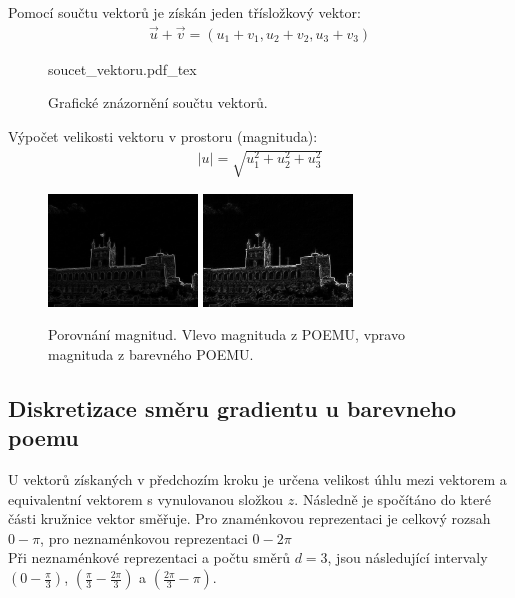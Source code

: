 \documentclass{report}
\begin{document}
Pomocí součtu vektorů je získán jeden třísložkový vektor:
\begin{align}
   \label{soucet_vektrou} \vec{u} + \vec{v} = (u_1 + v_1, u_2 + v_2, u_3 + v_3 )
\end{align} 

\begin{figure}[H]
    \centering    
    \def\svgwidth{\columnwidth}
	{soucet_vektoru.pdf_tex}    
    \caption{Grafické znázornění součtu vektorů.}
    \label{fig: soucet_vektoru}
\end{figure}


Výpočet velikosti vektoru v prostoru (magnituda):
\begin{align}
   \label{velikost_vektoru_v_prostoru} |u| = \sqrt{u_1^2 + u_2^2 + u_3^2}
\end{align} 

\begin{figure}[H]
		\centering
		\includegraphics[width=150px]{./img/magnitude.jpg}	
		\includegraphics[width=150px]{./img/magnitude_3.jpg}	
		\caption{Porovnání magnitud. Vlevo magnituda z POEMU, vpravo magnituda z barevného POEMU.}
\end{figure}


\subsection{Diskretizace směru gradientu u barevneho poemu}
U vektorů získaných v předchozím kroku je určena velikost úhlu mezi vektorem a equivalentní vektorem s vynulovanou složkou $z$. Následně je spočítáno do které části kružnice vektor směřuje. Pro znaménkovou reprezentaci je celkový rozsah $0 - \pi$, pro neznaménkovou reprezentaci $0 - 2\pi$
\\
Při neznaménkové reprezentaci a počtu směrů $d = 3$, jsou následující intervaly $\left(0 - \frac{\pi}{3}\right)$, $\left(\frac{\pi}{3} - \frac{2\pi}{3}\right)$ a  $\left(\frac{2\pi}{3} - \pi\right)$.
\end{document}
